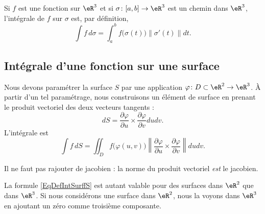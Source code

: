 Si $f$ est une fonction sur $\eR^3$ et si $\sigma\colon \mathopen[ a , b \mathclose]\to \eR^3$ est un chemin dans $\eR^3$, l'intégrale de $f$ sur $\sigma$ est, par définition,
\begin{equation}
	\int f\,d\sigma=\int_a^b f\big( \sigma(t) \big)\| \sigma'(t) \|dt.
\end{equation}

\subsection{Intégrale d'une fonction sur une surface}

Nous devons paramétrer la surface $S$ par une application $\varphi\colon D\subset\eR^2\to \eR^3$. À partir d'un tel paramétrage, nous construisons un élément de surface en prenant le produit vectoriel des deux vecteurs tangents :
\begin{equation}
	dS=\frac{ \partial \varphi }{ \partial u }\times\frac{ \partial \varphi }{ \partial v }dudv.
\end{equation}
L'intégrale est
\begin{equation}        \label{EqDefIntSurffS}
	\int f\,dS=\iint_Df\big( \varphi(u,v) \big)\left\| \frac{ \partial \varphi }{ \partial u }\times\frac{ \partial \varphi }{ \partial v } \right\|dudv.
\end{equation}

Il ne faut pas rajouter de jacobien : la norme du produit vectoriel \emph{est} le jacobien.

\begin{remark}
	La formule \eqref{EqDefIntSurffS} est autant valable pour des surfaces dans $\eR^2$ que dans $\eR^3$. Si nous considérons une surface dans $\eR^2$, nous la voyons dans $\eR^3$ en ajoutant un zéro comme troisième composante.
\end{remark}

